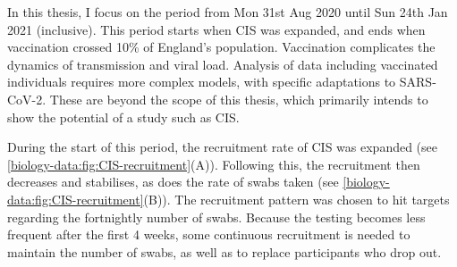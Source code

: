 \documentclass[thesis.tex]{subfiles}
\begin{document}
In this thesis, I focus on the period from Mon 31st Aug 2020 until Sun 24th Jan 2021 (inclusive).
This period starts when CIS was expanded, and ends when vaccination crossed 10\% of England's population.
Vaccination complicates the dynamics of transmission and viral load.
Analysis of data including vaccinated individuals requires more complex models, with specific adaptations to SARS-CoV-2.
These are beyond the scope of this thesis, which primarily intends to show the potential of a study such as CIS.

During the start of this period, the recruitment rate of CIS was expanded (see \cref{biology-data:fig:CIS-recruitment}(A)).
Following this, the recruitment then decreases and stabilises, as does the rate of swabs taken (see \cref{biology-data:fig:CIS-recruitment}(B)).
The recruitment pattern was chosen to hit targets regarding the fortnightly number of swabs.
Because the testing becomes less frequent after the first 4 weeks, some continuous recruitment is needed to maintain the number of swabs, as well as to replace participants who drop out.
\end{document}

